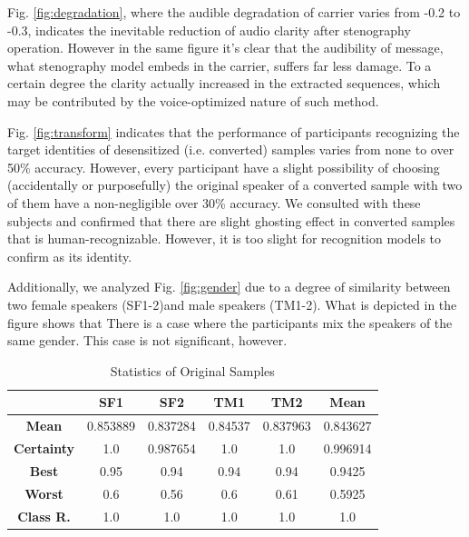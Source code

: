 \documentclass[journal]{IEEEtran} %
\begin{document}
Fig. \ref{fig:degradation}, where the audible degradation of carrier varies from -0.2 to -0.3, indicates the inevitable reduction of audio clarity after stenography operation. However in the same figure it's clear that the audibility of message, what stenography model embeds in the carrier, suffers far less damage. To a certain degree the clarity actually increased in the extracted sequences, which may be contributed by the voice-optimized nature of such method.

Fig. \ref{fig:transform} indicates that the performance of participants recognizing the target identities of desensitized (i.e. converted) samples varies from none to over 50\% accuracy. However, every participant have a slight possibility of choosing (accidentally or purposefully) the original speaker of a converted sample with two of them have a non-negligible over 30\% accuracy. We consulted with these subjects and confirmed that there are slight ghosting effect in converted samples that is human-recognizable. However, it is too slight for recognition models to confirm as its identity.

Additionally, we analyzed Fig. \ref{fig:gender} due to a degree of similarity between two female speakers (SF1-2)and male speakers (TM1-2). What is depicted in the figure shows that There is a case where the participants mix the speakers of the same gender. This case is not significant, however.

\begin{table}[!t]
    \centering
    \caption{Statistics of Original Samples}
    \begin{tabular}{|c|c|c|c|c|c|}
        \hline
        & \textbf{SF1} & \textbf{SF2} & \textbf{TM1} & \textbf{TM2} & \textbf{Mean} \\
        \hline
        \textbf{Mean} & 0.853889 & 0.837284 & 0.84537 & 0.837963 & 0.843627 \\
        \hline
        \textbf{Certainty} & 1.0 & 0.987654 & 1.0 & 1.0 & 0.996914 \\
        \hline
        \textbf{Best} & 0.95 & 0.94 & 0.94 & 0.94 & 0.9425\\
        \hline
        \textbf{Worst} & 0.6 & 0.56 & 0.6 & 0.61 & 0.5925\\
        \hline
        \textbf{Class R.} & 1.0 & 1.0 & 1.0 & 1.0 & 1.0\\
        \hline
    \end{tabular}
    \label{tab:st_org}
\end{table}
\end{document}

